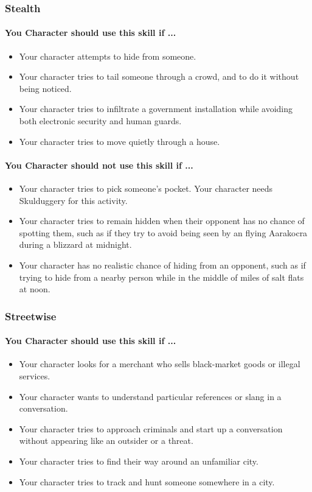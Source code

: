 \begin{multicols}{2}
\subsubsection{Stealth}\label{skill:stealth}
\paragraph{You Character should use this skill if ...}
\begin{itemize}
    \item Your character attempts to hide from someone.
    \item Your character tries to tail someone through a crowd, and to do it
        without being noticed.
    \item Your character tries to infiltrate a government installation while
        avoiding both electronic security and human guards.
    \item Your character tries to move quietly through a house.
\end{itemize}
\paragraph{You Character should not use this skill if ...}
\begin{itemize}
    \item Your character tries to pick someone's pocket. Your character needs
        Skulduggery for this activity.
    \item Your character tries to remain hidden when their opponent has no chance
        of spotting them, such as if they try to avoid being seen by an flying
        Aarakocra during a blizzard at midnight.
    \item Your character has no realistic chance of hiding from an opponent, such
        as if trying to hide from a nearby person while in the middle of miles of
        salt flats at noon.
\end{itemize}

\subsubsection{Streetwise}\label{skill:streetwise}
\paragraph{You Character should use this skill if ...}
\begin{itemize}
    \item Your character looks for a merchant who sells black-market goods or
        illegal services.
    \item Your character wants to understand particular references or slang in
        a conversation.
    \item Your character tries to approach criminals and start up a conversation
        without appearing like an outsider or a threat.
    \item Your character tries to find their way around an unfamiliar city.
    \item Your character tries to track and hunt someone somewhere in a city.
\end{itemize}

\end{multicols}
